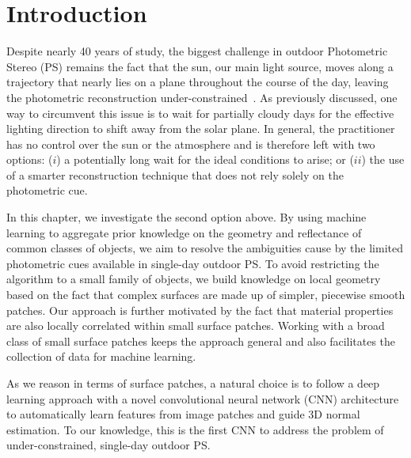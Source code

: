 \section{Introduction}

Despite nearly 40 years of study, the biggest challenge in outdoor Photometric Stereo (PS) remains the fact that the sun, our main light source, moves along a trajectory that nearly lies on a plane throughout the course of the day, leaving the photometric reconstruction under-constrained~\cite{woodham-opteng-80}.
As previously discussed, one way to circumvent this issue is to wait for partially cloudy days for the effective lighting direction to shift away from the solar plane.
In general, the practitioner has no control over the sun or the atmosphere and is therefore left with two options: ($i$) a potentially long wait for the ideal conditions to arise; or ($ii$) the use of a smarter reconstruction technique that does not rely solely on the photometric cue.

In this chapter, we investigate the second option above. By using machine learning to aggregate prior knowledge on the geometry and reflectance of common classes of objects, we aim to resolve the ambiguities cause by the limited photometric cues available in single-day outdoor PS. To avoid restricting the algorithm to a small family of objects, we build knowledge on local geometry based on the fact that complex surfaces are made up of simpler, piecewise smooth patches. Our approach is further motivated by the fact that material properties are also locally correlated within small surface patches. Working with a broad class of small surface patches keeps the approach general and also facilitates the collection of data for machine learning.


As we reason in terms of surface patches, a natural choice is to follow a deep learning approach with a novel convolutional neural network (CNN) architecture to automatically learn features from image patches and guide 3D normal estimation. To our knowledge, this is the first CNN to address the problem of under-constrained, single-day outdoor PS.

